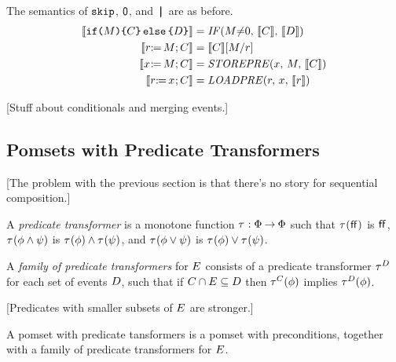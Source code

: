 The semantics of $\SKIP$, $\NIL$, and $\PAR$ are as before.
\begin{align*}
  \sem{\IF{\aExp}\THEN\aCmd\ELSE\bCmd\FI} &= \sIF{\aExp{\neq}0}\sTHEN\sem{\aCmd}\sELSE\sem{\bCmd}\sFI
  \\
  \sem{\LET{\aReg}{\aExp}\SEMI \aCmd} &= \sem{\aCmd}[\aExp/\aReg]
  \\
  \sem{\PW{\aLoc}{\aExp}\SEMI \aCmd} &= \sSTOREPRE{\aLoc}{\aExp}{\sem{\aCmd}}
  \\
  \sem{\PR{\aLoc}{\aReg}\SEMI \aCmd} &= \sLOADPRE{\aReg}{\aLoc}{\sem{\aReg}}
\end{align*}

[Stuff about conditionals and merging events.]


\subsection{Pomsets with Predicate Transformers}

\begin{figure*}
  
  \caption{Weakest Precondition and Strongest Postcondition \cite{}}
\end{figure*}

[The problem with the previous section is that there's no story for
sequential composition.]

\begin{definition}
  A \emph{predicate transformer} is a monotone function
  $\aTr:\Formulae\fun\Formulae$ such that
  $\aTr(\FALSE)$ is $\FALSE$,
  $\aTr(\aForm\land\bForm)$ is $\aTr(\aForm)\land\aTr(\bForm)$, and
  $\aTr(\aForm\lor\bForm)$ is $\aTr(\aForm)\lor\aTr(\bForm)$.
\end{definition}

\begin{definition}
  A \emph{family of predicate transformers}
  for $\aEvs$
  consists of a predicate transformer
  $\aTr[\bEvs]$ for each set of events $\bEvs$,
  such that if $\cEvs \cap \aEvs \subseteq \bEvs$
  then $\aTr[\cEvs](\aForm)$ implies $\aTr[\bEvs](\aForm)$.
\end{definition}

[Predicates with smaller subsets of $\aEvs$ are stronger.]

\begin{definition}
  A pomset with predicate tansformers is a pomset with preconditions,
  together with a family of predicate transformers for $\aEvs$.
\end{definition}

